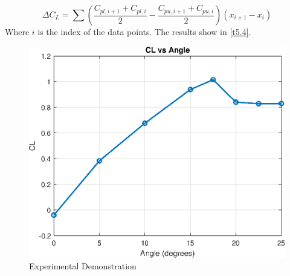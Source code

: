 $$
\Delta C_{L}=\sum\left(\frac{C_{pl,i+1}+C_{pl,i}}{2}-\frac{C_{p u ,i+1}+C_{p u ,i}}{2}\right)\left(x_{i+1}-x_{i}\right)
$$
Where $i$ is the index of the data points. The results show in \autoref{t5.4}.
\begin{table}[]
    \caption{Lift coefficient in different angle} 
	\label{t5.4}
    \centering
    \end{table}

\begin{figure}[htb] %
        \centering
        \includegraphics[scale=0.45]{CL.eps}
        \caption{Experimental Demonstration}
        \label{tcl}
\end{figure}

